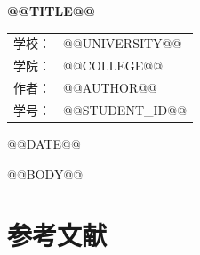 \documentclass[UTF8,zihao=-4,fontset=none]{ctexart}
\begin{document}
\hypersetup{pageanchor=false}
\begin{titlepage}
  \centering
  {\bfseries @@TITLE@@\par}
  \vspace{2.5cm}
  \begin{tabular}{rl}
    学校：& @@UNIVERSITY@@\\[0.7em]
    学院：& @@COLLEGE@@\\[0.7em]
    作者：& @@AUTHOR@@\\[0.7em]
    学号：& @@STUDENT_ID@@\\
  \end{tabular}
  \vfill
  {@@DATE@@\par}
\end{titlepage}
\hypersetup{pageanchor=true}

\begin{abstract}

\noindent\textbf{关键词：}
\end{abstract}

\tableofcontents
\newpage

@@BODY@@

\section*{参考文献}
\begin{enumerate}[label={[\arabic*]}]
  \item {}
\end{enumerate}
\end{document}

